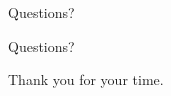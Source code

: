 \documentclass[aspectratio=169, 10pt]{beamer}
\begin{document}
\begin{frame}{Questions?}
    \begin{center}
        \Huge Questions?
        
        \vspace{1em}
        \large Thank you for your time.
    \end{center}
\end{frame}
\end{document}
